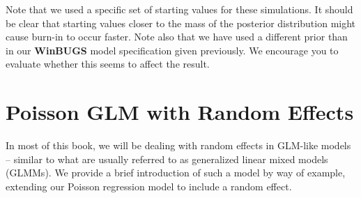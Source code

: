 Note that we used a specific set of starting values for these
simulations. It should be clear that starting values closer to the
mass of the posterior distribution might cause burn-in to occur
faster. 
Note also that we have
used a different prior than in our {\bf WinBUGS} model specification
given previously. We encourage you to evaluate 
 whether this seems to affect the result.

\section{Poisson GLM with Random Effects}

In most of this book, we will be dealing with random
effects in GLM-like models -- similar to what
are usually referred to as generalized
linear mixed models (GLMMs). We provide a brief introduction of such a
model by way of
example, extending our Poisson regression model to include a random effect.


